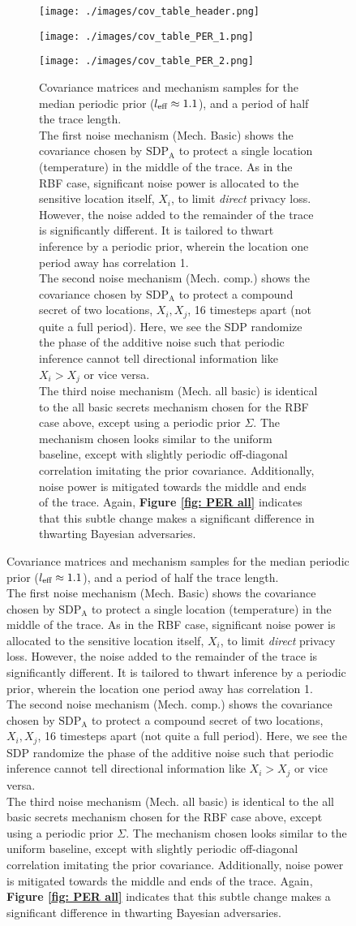 \begin{figure*}[h]
\begin{subfigure}[b]{1\textwidth}
{			}
		\label{fig: cov table rbf}
	\end{subfigure}
\end{figure*}

\begin{figure*}[h] \ContinuedFloat
	\begin{subfigure}[b]{1\textwidth}
		\centering
		\texttt{[image: ./images/cov\_table\_header.png]}
	\end{subfigure}
	\begin{subfigure}[b]{1\textwidth}
		\centering
		\texttt{[image: ./images/cov\_table\_PER\_1.png]}
	\end{subfigure}
	\begin{subfigure}[b]{1\textwidth}
		\centering
		\texttt{[image: ./images/cov\_table\_PER\_2.png]}
		\caption[Covariance matrices and mechanism samples for the median periodic prior ($l_{\text{eff}} \approx 1.1$), and a period of half the trace length.]{
			Covariance matrices and mechanism samples for the median periodic prior ($l_{\text{eff}} \approx 1.1$), and a period of half the trace length. 
			\vspace{2mm} \\
			The first noise mechanism (Mech. Basic) shows the covariance chosen by $\text{SDP}_\text{A}$ to protect a single location (temperature) in the middle of the trace. As in the RBF case, significant noise power is allocated to the sensitive location itself, $X_i$, to limit \emph{direct} privacy loss. However, the noise added to the remainder of the trace is significantly different. It is tailored to thwart inference by a periodic prior, wherein the location one period away has correlation 1. 
			\vspace{2mm}\\
			The second noise mechanism (Mech. comp.) shows the covariance chosen by $\text{SDP}_\text{A}$ to protect a compound secret of two locations, $X_i, X_j$, 16 timesteps apart (not quite a full period). Here, we see the SDP randomize the phase of the additive noise such that periodic inference cannot tell directional information like $X_i > X_j$ or vice versa. 
			\vspace{2mm}\\
			The third noise mechanism (Mech. all basic) is identical to the all basic secrets mechanism chosen for the RBF case above, except using a periodic prior $\Sigma$. The mechanism chosen looks similar to the uniform baseline, except with slightly periodic off-diagonal correlation imitating the prior covariance. Additionally, noise power is mitigated towards the middle and ends of the trace. Again, \textbf{Figure \ref{fig: PER all}} indicates that this subtle change makes a significant difference in thwarting Bayesian adversaries. 
			}
		\label{fig: cov table rbf}
	\end{subfigure}
\end{figure*}

